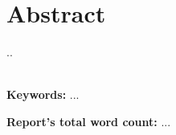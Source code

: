 \chapter*{\center \Large  Abstract}
..

~\\[1cm]
\noindent
\textbf{Keywords:} ...

\vfill
\noindent
\textbf{Report's total word count:} ...

